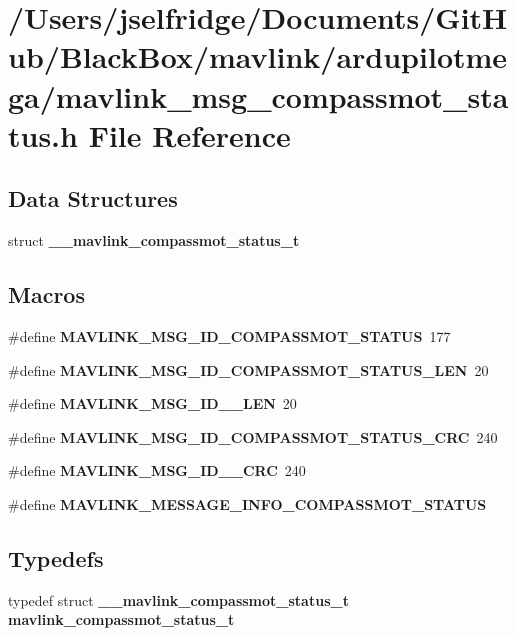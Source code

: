 \section{/\+Users/jselfridge/\+Documents/\+Git\+Hub/\+Black\+Box/mavlink/ardupilotmega/mavlink\+\_\+msg\+\_\+compassmot\+\_\+status.h File Reference}
\label{mavlink__msg__compassmot__status_8h}
\subsection*{Data Structures}
\begin{DoxyCompactItemize}
\item 
struct \textbf{ \+\_\+\+\_\+mavlink\+\_\+compassmot\+\_\+status\+\_\+t}
\end{DoxyCompactItemize}
\subsection*{Macros}
\begin{DoxyCompactItemize}
\item 
\#define \textbf{ M\+A\+V\+L\+I\+N\+K\+\_\+\+M\+S\+G\+\_\+\+I\+D\+\_\+\+C\+O\+M\+P\+A\+S\+S\+M\+O\+T\+\_\+\+S\+T\+A\+T\+US}~177
\item 
\#define \textbf{ M\+A\+V\+L\+I\+N\+K\+\_\+\+M\+S\+G\+\_\+\+I\+D\+\_\+\+C\+O\+M\+P\+A\+S\+S\+M\+O\+T\+\_\+\+S\+T\+A\+T\+U\+S\+\_\+\+L\+EN}~20
\item 
\#define \textbf{ M\+A\+V\+L\+I\+N\+K\+\_\+\+M\+S\+G\+\_\+\+I\+D\+\_\+\_\+\+L\+EN}~20
\item 
\#define \textbf{ M\+A\+V\+L\+I\+N\+K\+\_\+\+M\+S\+G\+\_\+\+I\+D\+\_\+\+C\+O\+M\+P\+A\+S\+S\+M\+O\+T\+\_\+\+S\+T\+A\+T\+U\+S\+\_\+\+C\+RC}~240
\item 
\#define \textbf{ M\+A\+V\+L\+I\+N\+K\+\_\+\+M\+S\+G\+\_\+\+I\+D\+\_\+\_\+\+C\+RC}~240
\item 
\#define \textbf{ M\+A\+V\+L\+I\+N\+K\+\_\+\+M\+E\+S\+S\+A\+G\+E\+\_\+\+I\+N\+F\+O\+\_\+\+C\+O\+M\+P\+A\+S\+S\+M\+O\+T\+\_\+\+S\+T\+A\+T\+US}
\end{DoxyCompactItemize}
\subsection*{Typedefs}
\begin{DoxyCompactItemize}
\item 
typedef struct \textbf{ \+\_\+\+\_\+mavlink\+\_\+compassmot\+\_\+status\+\_\+t} \textbf{ mavlink\+\_\+compassmot\+\_\+status\+\_\+t}
\end{DoxyCompactItemize}



